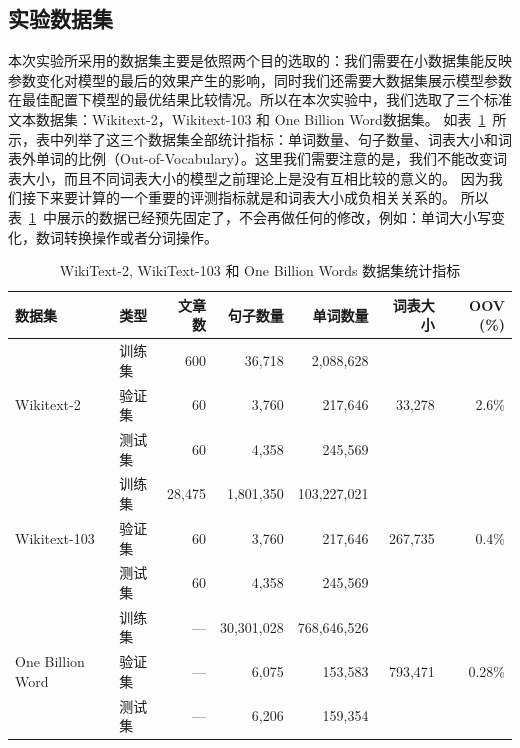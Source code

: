 \subsection{实验数据集}
本次实验所采用的数据集主要是依照两个目的选取的：我们需要在小数据集能反映参数变化对模型的最后的效果产生的影响，同时我们还需要大数据集展示模型参数在最佳配置下模型的最优结果比较情况。所以在本次实验中，我们选取了三个标准文本数据集：Wikitext-2，Wikitext-103 和 One Billion Word数据集。
如表~\ref{tab:dataset}~所示，表中列举了这三个数据集全部统计指标：单词数量、句子数量、词表大小和词表外单词的比例（Out-of-Vocabulary）。这里我们需要注意的是，我们不能改变词表大小，而且不同词表大小的模型之前理论上是没有互相比较的意义的。
因为我们接下来要计算的一个重要的评测指标就是和词表大小成负相关关系的。
所以表~\ref{tab:dataset}~中展示的数据已经预先固定了，不会再做任何的修改，例如：单词大小写变化，数词转换操作或者分词操作。
\begin{table}
  \centering
  \caption{WikiText-2, WikiText-103 和 One Billion Words 数据集统计指标 \label{tab:dataset}}
\begin{tabular}{llrrrrr}
\toprule
数据集& 类型& 文章数 & 句子数量 &  单词数量 &词表大小 & OOV (\%) \\ \midrule
\multirow{3}{*}{Wikitext-2} &训练集& 600 & 36,718 & 2,088,628 & \multirow{3}{*}{33,278} & \multirow{3}{*}{2.6\%} \\
&验证集& 60 &3,760 & 217,646  & &\\
&测试集& 60 & 4,358 & 245,569 & &\\
\midrule
\multirow{3}{*}{Wikitext-103} &训练集& 28,475 &  1,801,350 &  103,227,021 & \multirow{3}{*}{267,735} & \multirow{3}{*}{0.4\%} \\
&验证集& 60 &3,760 & 217,646  & &\\
&测试集& 60 & 4,358 & 245,569 & &\\
\midrule
\multirow{3}{*}{One Billion Word} &训练集& --- &30,301,028&768,646,526&   \multirow{3}{*}{793,471} &   \multirow{3}{*}{0.28\%} \\
 &验证集& --- &  6,075 &   153,583 &&\\
 &测试集 & --- &  6,206 &   159,354 &&\\
\bottomrule
\end{tabular}
\end{table}

